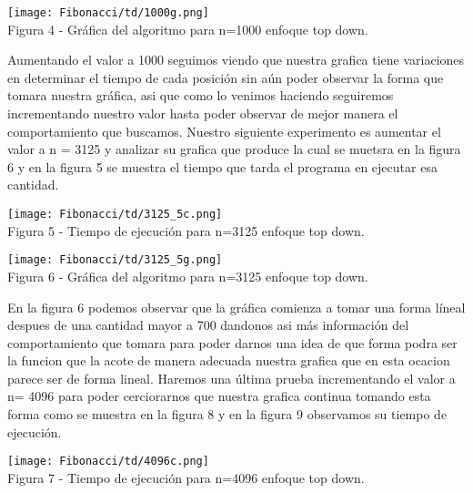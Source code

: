 \documentclass[12pt,twoside]{article}
\begin{document}
\begin{center}
    \texttt{[image: Fibonacci/td/1000g.png]}\\
    Figura 4 - Gráfica del algoritmo para n=1000 enfoque top down.
\end{center}
\newline
Aumentando el valor a 1000 seguimos viendo que nuestra grafica tiene variaciones en determinar el tiempo de cada posición sin aún poder observar la forma que tomara nuestra gráfica, asi que como lo venimos haciendo seguiremos incrementando nuestro valor hasta poder observar de mejor manera el comportamiento que buscamos.
Nuestro siguiente experimento es aumentar el valor a   n = 3125 y analizar su grafica que produce la cual se muetsra en la figura 6 y en la figura 5 se muestra el tiempo que tarda el programa en ejecutar esa cantidad.
\begin{center}
    \texttt{[image: Fibonacci/td/3125\_5c.png]}\\
    Figura 5 - Tiempo de ejecución para n=3125 enfoque top down.
\end{center}

\begin{center}
    \texttt{[image: Fibonacci/td/3125\_5g.png]}\\
    Figura 6 - Gráfica del algoritmo para n=3125 enfoque top down.
\end{center}
\newline
En la figura 6 podemos observar que la gráfica comienza a tomar una forma líneal despues de una cantidad mayor a 700 dandonos asi más información del comportamiento que tomara para poder darnos una idea de que forma podra ser la funcion que la acote de manera adecuada nuestra grafica que en esta ocacion parece ser de forma lineal.
Haremos una última prueba incrementando el valor a n= 4096 para poder cerciorarnos que nuestra grafica continua tomando esta forma como se muestra en la figura 8 y en la figura 9 observamos su tiempo de ejecución.
\begin{center}
    \texttt{[image: Fibonacci/td/4096c.png]}\\
    Figura 7 - Tiempo de ejecución para n=4096 enfoque top down.
\end{center}
\end{document}

